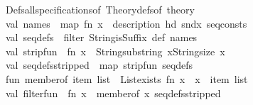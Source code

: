 \begin{isabellebody}
\ \ \ \ {\isacharparenleft}{\kern0pt}Defs{\isachardot}{\kern0pt}all{\isacharunderscore}{\kern0pt}specifications{\isacharunderscore}{\kern0pt}of\ {\isacharparenleft}{\kern0pt}Theory{\isachardot}{\kern0pt}defs{\isacharunderscore}{\kern0pt}of\ {\isacharat}{\kern0pt}{\isacharbraceleft}{\kern0pt}theory{\isacharbraceright}{\kern0pt}{\isacharparenright}{\kern0pt}{\isacharparenright}{\kern0pt}\isanewline
\ \ \ \ val\ names\ {\isacharequal}{\kern0pt}\ map\ {\isacharparenleft}{\kern0pt}fn\ x\ {\isacharequal}{\kern0pt}{\isachargreater}{\kern0pt}\ {\isacharparenleft}{\kern0pt}{\isacharhash}{\kern0pt}description\ {\isacharparenleft}{\kern0pt}hd\ {\isacharparenleft}{\kern0pt}snd{\isacharparenleft}{\kern0pt}x{\isacharparenright}{\kern0pt}{\isacharparenright}{\kern0pt}{\isacharparenright}{\kern0pt}{\isacharparenright}{\kern0pt}{\isacharparenright}{\kern0pt}\ seq{\isacharunderscore}{\kern0pt}consts\isanewline
\ \ \ \ val\ seq{\isacharunderscore}{\kern0pt}defs\ {\isacharequal}{\kern0pt}\ filter\ {\isacharparenleft}{\kern0pt}String{\isachardot}{\kern0pt}isSuffix\ {\isacharparenleft}{\kern0pt}{\isachardoublequote}{\kern0pt}{\isacharunderscore}{\kern0pt}def{\isachardoublequote}{\kern0pt}{\isacharparenright}{\kern0pt}{\isacharparenright}{\kern0pt}\ names\ \isanewline
\ \ \ \ val\ strip{\isacharunderscore}{\kern0pt}fun\ {\isacharequal}{\kern0pt}\ fn\ x\ {\isacharequal}{\kern0pt}{\isachargreater}{\kern0pt}\ String{\isachardot}{\kern0pt}substring\ {\isacharparenleft}{\kern0pt}{\isacharparenleft}{\kern0pt}x{\isacharparenright}{\kern0pt}{\isacharcomma}{\kern0pt}{}{\isacharcomma}{\kern0pt}{\isacharparenleft}{\kern0pt}{\isacharparenleft}{\kern0pt}String{\isachardot}{\kern0pt}size\ x{\isacharparenright}{\kern0pt}{\isacharminus}{\kern0pt}{}{\isacharparenright}{\kern0pt}{\isacharparenright}{\kern0pt}\isanewline
\ \ \ \ val\ seq{\isacharunderscore}{\kern0pt}defs{\isacharunderscore}{\kern0pt}stripped\ {\isacharequal}{\kern0pt}\ map\ strip{\isacharunderscore}{\kern0pt}fun\ seq{\isacharunderscore}{\kern0pt}defs\isanewline
\isanewline
\ \ \ \ fun\ member{\isacharunderscore}{\kern0pt}of\ {\isacharparenleft}{\kern0pt}item{\isacharcomma}{\kern0pt}\ list{\isacharparenright}{\kern0pt}\ {\isacharequal}{\kern0pt}\ List{\isachardot}{\kern0pt}exists\ {\isacharparenleft}{\kern0pt}fn\ x\ {\isacharequal}{\kern0pt}{\isachargreater}{\kern0pt}\ x\ {\isacharequal}{\kern0pt}\ item{\isacharparenright}{\kern0pt}\ list\isanewline
\ \ \ \ val\ filter{\isacharunderscore}{\kern0pt}fun\ {\isacharequal}{\kern0pt}\ fn\ x\ {\isacharequal}{\kern0pt}{\isachargreater}{\kern0pt}\ member{\isacharunderscore}{\kern0pt}of\ {\isacharparenleft}{\kern0pt}x{\isacharcomma}{\kern0pt}\ seq{\isacharunderscore}{\kern0pt}defs{\isacharunderscore}{\kern0pt}stripped{\isacharparenright}{\kern0pt}\isanewline

\end{isabellebody}
